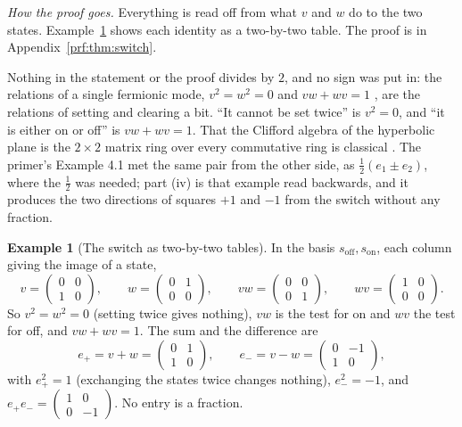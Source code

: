 \documentclass[11pt]{article}
\theoremstyle{plain}
\theoremstyle{definition}
\newtheorem{example}{Example}
\theoremstyle{plain}
\theoremstyle{definition}
\begin{document}
\noindent\emph{How the proof goes.} Everything is read off from what $v$ and $w$ do to the two states. Example~\ref{ex:tables} shows each identity as a two-by-two table. The proof is in Appendix~\ref{prf:thm:switch}.

Nothing in the statement or the proof divides by $2$, and no sign was put in: the relations of a single fermionic mode, $v^{2} = w^{2} = 0$ and $vw + wv = 1$ \cite{JordanWigner1928}, are the relations of setting and clearing a bit. ``It cannot be set twice'' is $v^{2} = 0$, and ``it is either on or off'' is $vw + wv = 1$. That the Clifford algebra of the hyperbolic plane is the $2 \times 2$ matrix ring over every commutative ring is classical \cite{Bass1974, Knus1991}. The primer's Example 4.1 \cite{ButlerT0} met the same pair from the other side, as $\tfrac12(e_{1} \pm e_{2})$, where the $\tfrac12$ was needed; part (iv) is that example read backwards, and it produces the two directions of squares $+1$ and $-1$ from the switch without any fraction.

\begin{example}[The switch as two-by-two tables]\label{ex:tables}
In the basis $s_{\mathrm{off}}, s_{\mathrm{on}}$, each column giving the image of a state,
\[
v = \begin{pmatrix} 0 & 0 \\ 1 & 0 \end{pmatrix}, \qquad
w = \begin{pmatrix} 0 & 1 \\ 0 & 0 \end{pmatrix}, \qquad
vw = \begin{pmatrix} 0 & 0 \\ 0 & 1 \end{pmatrix}, \qquad
wv = \begin{pmatrix} 1 & 0 \\ 0 & 0 \end{pmatrix} .
\]
So $v^{2} = w^{2} = 0$ (setting twice gives nothing), $vw$ is the test for on and $wv$ the test for off, and $vw + wv = 1$. The sum and the difference are
\[
e_{+} = v + w = \begin{pmatrix} 0 & 1 \\ 1 & 0 \end{pmatrix}, \qquad
e_{-} = v - w = \begin{pmatrix} 0 & -1 \\ 1 & 0 \end{pmatrix},
\]
with $e_{+}^{2} = 1$ (exchanging the states twice changes nothing), $e_{-}^{2} = -1$, and $e_{+}e_{-} = \begin{pmatrix} 1 & 0 \\ 0 & -1 \end{pmatrix}$. No entry is a fraction.
\end{example}
\end{document}
